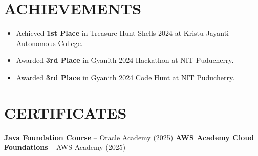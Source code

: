 \documentclass[10pt,a4paper]{article}
\begin{document}

\section*{ACHIEVEMENTS}

\begin{itemize}

\item Achieved \textbf{1st Place} in Treasure Hunt Shells 2024 at Kristu Jayanti Autonomous College.

\item Awarded \textbf{3rd Place} in Gyanith 2024 Hackathon at NIT Puducherry.

\item Awarded \textbf{3rd Place} in Gyanith 2024 Code Hunt at NIT Puducherry.

\end{itemize}


\section*{CERTIFICATES}
\small
\textbf{Java Foundation Course} -- Oracle Academy (2025)
\hfill
\textbf{AWS Academy Cloud Foundations} -- AWS Academy (2025)
\end{document}
